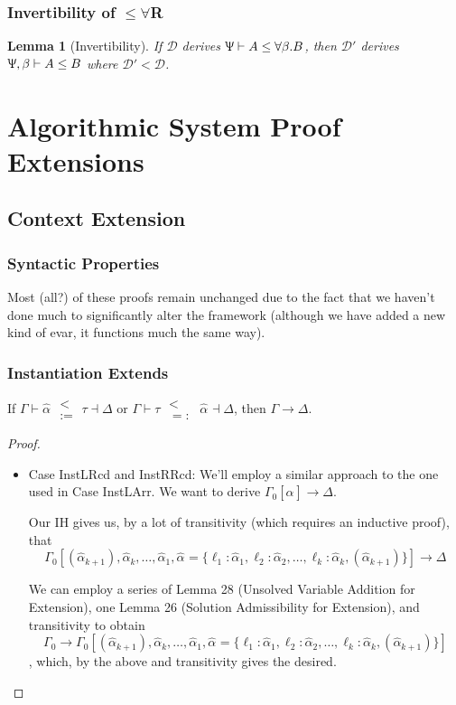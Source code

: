 \documentclass{article}
\newtheorem{lem}[thm]{Lemma}
\newenvironment{manuallemma}[1]{%
  \renewcommand\themanuallemmainner{#1}%
  \manuallemmainner
}{\endmanuallemmainner}
\newcommand{\declCtx}{\Uppsi}
\newcommand{\instLSymbol}{\;\substack{<\\:=}\;}
\newcommand{\instRSymbol}{\;\substack{<\\=:}\;}
\newcommand{\ev}{\hat}
\newcommand{\eva}[1][]{\ev \alpha_{#1}}
\newcommand{\subtypes}[3]{#1 \vdash #2 \le #3}
\newcommand{\instL}[4]{#1 \vdash #2 \instLSymbol #3 \dashv #4}
\newcommand{\instR}[4]{#1 \vdash #2 \instRSymbol #3 \dashv #4}
\newcommand{\extends}{\longrightarrow}
\begin{document}
\subsubsection{Invertibility of \(\le \forall\)R}
\begin{lem}[Invertibility]
  If \(\mathcal{D}\) derives \(\subtypes \declCtx A {\forall \beta. B}\), then
  \(\mathcal{D}'\) derives \(\subtypes {\declCtx, \beta} A B\) where \(\mathcal
  D ' < \mathcal D\).
\end{lem}

\section{Algorithmic System Proof Extensions}

\subsection{Context Extension}

\subsubsection{Syntactic Properties}

Most (all?) of these proofs remain unchanged due to the fact that we haven't
done much to significantly alter the framework (although we have added a new
kind of evar, it functions much the same way).

\subsubsection{Instantiation Extends}

\begin{manuallemma}{32}[Instantiation Extends]
  If \(\instL \Gamma \eva \tau \Delta\) or \(\instR \Gamma \tau \eva \Delta\),
  then \(\Gamma \extends \Delta\).
\end{manuallemma}

\begin{proof}
  \begin{itemize}
  \item Case InstLRcd and InstRRcd: We'll employ a similar approach to the one
    used in Case InstLArr. We want to derive \(\Gamma_0[\eva] \extends \Delta\).

    Our IH gives us, by a lot of transitivity (which requires an inductive
    proof), that
      \[\Gamma_0[(\eva[k+1]),\eva[k],\dots,\eva[1],\eva = \{\ell_1 : \eva[1],
        \ell_2 : \eva[2], \dots, \ell_k : \eva[k], (\eva[k+1])\}] \extends \Delta\]

      We can employ a series of Lemma 28 (Unsolved Variable Addition for
      Extension), one Lemma 26 (Solution Admissibility for Extension), and
      transitivity to obtain
    \[\Gamma_0 \extends \Gamma_0[(\eva[k+1]),\eva[k],\dots,\eva[1],\eva = \{\ell_1 : \eva[1],
      \ell_2 : \eva[2], \dots, \ell_k : \eva[k], (\eva[k+1])\}]\],
    which, by the above and transitivity gives the desired.
  \end{itemize}
\end{proof}
\end{document}
